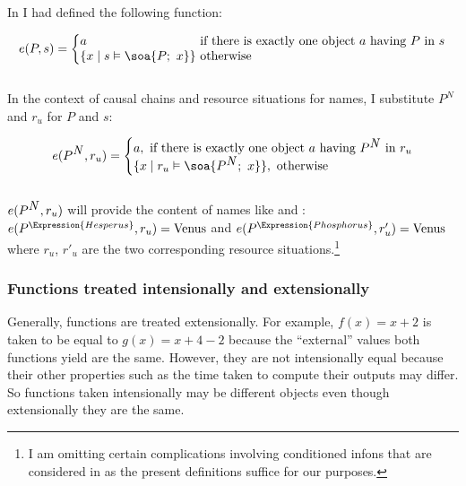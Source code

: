 In  I had defined the following function:

\begin{equation}
e(P,s) = \left\{\begin{array}{@{}l@{~}l@{}}
a & \mbox{if there is exactly one object $a$ having $P$ in $s$} \\
\{x \mid s \vDash \soa{P;\ x}\} & \mbox{otherwise}
\label{eq:eps}			\end{array}
		\right.
\end{equation}
~\\
In the context of causal chains and resource situations for names, I substitute $P^N$ and $r_u$ for $P$ and $s$:

\begin{equation}
e(P^{\hbox{\emph{N}}},r_u) = \left\{\begin{array}{@{}l@{}}
a,~\text{if there is exactly one object $a$ having $P^{\hbox{\emph{N}}}$ in $r_u$} \\ 
\{x \mid r_u \vDash \soa{P^{\hbox{\emph{N}}};\ x}\},~\mbox{otherwise}
\label{eq:eps}			\end{array}
		\right.
\end{equation}
~\\
$e(P^{\hbox{\emph{N}}},r_u)$ will provide the content of names like  and :\linebreak $e(P^{\Expression{Hesperus}},r_u) = \hbox{Venus}$ and $e(P^{\Expression{Phosphorus}},r'_u) = \hbox{Venus}$ where $r_u$, $r'_u$ are the two corresponding resource situations.\footnote{I am omitting certain complications involving conditioned infons that are considered in \citet{parikh:le} as the present definitions suffice for our purposes.}

\subsubsection{Functions treated intensionally and extensionally}

Generally, functions are treated extensionally. For example, $f(x) = x + 2$ is taken to be equal to $g(x) = x + 4 - 2$ because the ``external'' values both functions yield are the same. However, they are not intensionally equal because their other properties  such as the time taken to compute their outputs may differ. So functions taken intensionally may be different objects even though extensionally they are the same.

